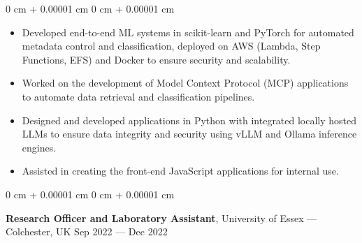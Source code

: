 \documentclass[10pt, letterpaper]{article}
\newenvironment{highlights}{
    \begin{itemize}[
        topsep=0.10 cm,
        parsep=0.10 cm,
        partopsep=0pt,
        itemsep=0pt,
        leftmargin=0 cm + 10pt
    ]
}{
    \end{itemize}
} %
\newenvironment{onecolentry}{
    \begin{adjustwidth}{
        0 cm + 0.00001 cm
    }{
        0 cm + 0.00001 cm
    }
}{
    \end{adjustwidth}
} %
\newenvironment{twocolentry}[2][]{
    \onecolentry
    \def\secondColumn{#2}
    \setcolumnwidth{\fill, 4.5 cm}
    \begin{paracol}{2}
}{
    \switchcolumn \raggedleft \secondColumn
    \end{paracol}
    \endonecolentry
} %
\begin{document}
        \vspace{0.10 cm}
        \begin{onecolentry}
            \begin{highlights}
            \item Developed end-to-end ML systems in scikit-learn and PyTorch for automated metadata control and classification, deployed on AWS (Lambda, Step Functions, EFS) and Docker to ensure security and scalability.
              \item Worked on the development of Model Context Protocol (MCP) applications to automate data retrieval and classification pipelines.
              \item Designed and developed applications in Python with integrated locally hosted LLMs to ensure data integrity and security using vLLM and Ollama inference engines.
              \item Assisted in creating the front-end JavaScript applications for internal use.
            \end{highlights}
        \end{onecolentry}


        \vspace{0.2 cm}

        \begin{twocolentry}{
            Sep 2022 --- Dec 2022
        }
            \textbf{Research Officer and Laboratory Assistant}, University of Essex --- Colchester, UK\end{twocolentry}
\end{document}
